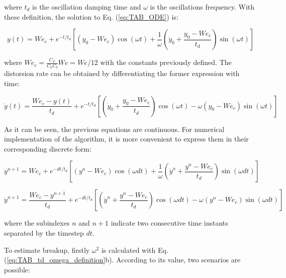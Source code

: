where $t_d$ is the oscillation damping time and $\omega$ is the oscillations frequency. With these definition, the solution to Eq. (\ref{eq:TAB_ODE}) is:

\begin{equation}
\label{eq:yTAB_equation_general}
y \left( t \right) = We_c + e^{- t / t_d} \left[ \left( y_0 - We_c \right) \cos \left( \omega t \right) + \frac{1}{\omega}\left( \dot{y}_0 + \frac{y_0 - We_c}{t_d} \right) \sin \left( \omega t \right)   \right]
\end{equation}

where $We_c = \frac{C_F}{C_k C_b} We = We / 12$ with the constants previously defined. The distorsion rate can be obtained by differentiating the former expression with time:

\begin{equation}
\label{eq:dydtTAB_equation_general}
\dot{y} \left( t \right) = \frac{We_c - y \left( t \right) }{t_d} + e^{- t / t_d} \left[ \left( \dot{y}_0 + \frac{y_0 - We_c}{t_d} \right) \cos \left( \omega t \right) - \omega \left( y_0 - We_c \right) \sin \left( \omega t \right)  \right]
\end{equation}

As it can be seen, the previous equations are continuous. For numerical implementation of the algorithm, it is more convenient to express them in their corresponding discrete form:

\begin{equation}
\label{eq:yTAB_equation_discrete}
y^{n+1} = We_c + e^{- dt / t_d} \left[ \left( y^n - We_c \right) \cos \left( \omega dt \right) + \frac{1}{\omega}\left( \dot{y}^n + \frac{y^n - We_c}{t_d} \right) \sin \left( \omega dt \right)   \right]
\end{equation}

\begin{equation}
\label{eq:dydtTAB_equation_discrete}
\dot{y}^{n+1} = \frac{We_c - y^{n+1} }{t_d} + e^{- dt / t_d} \left[ \left( \dot{y}^n + \frac{y^n - We_c}{t_d} \right) \cos \left( \omega dt \right) - \omega \left( y^n - We_c \right) \sin \left( \omega dt \right)  \right]
\end{equation}

where the subindexes $n$ and $n+1$ indicate two consecutive time instants separated by the timestep $dt$.

To estimate breakup, firstly $\omega^2$ is calculated with Eq. (\ref{eq:TAB_td_omega_definition}b). According to its value, two scenarios are possible:

